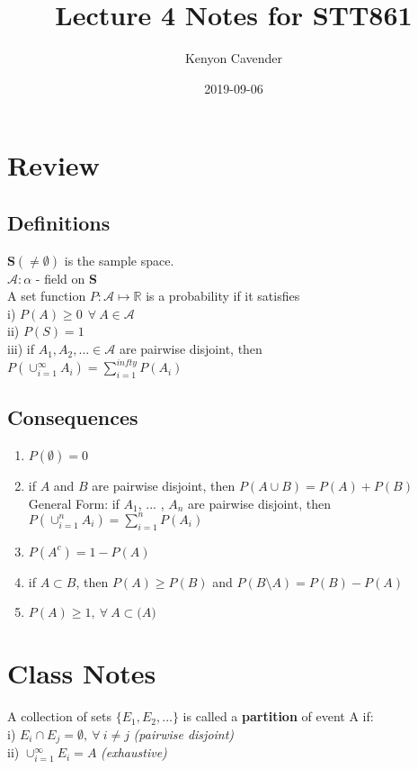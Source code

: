\documentclass[14pt, oneside, letterpaper]{notes}
\begin{document}
\title{Lecture 4 Notes for STT861}
\author{Kenyon Cavender}
\date{2019-09-06}
\maketitle

\section{Review}
\subsection*{Definitions}
$\textbf{S} ( \neq \emptyset )$ is the sample space. \\
$\mathscr{A} :  \alpha  $ - field on \textbf{S} \\
A set function $P: \mathscr{A} \mapsto \mathbb{R}$ is a probability if it satisfies \\
\indent i) $P(A) \geq 0 \: \: \forall \: A \in \mathscr{A}$ \\
\indent ii) $P(S) = 1 $\\
\indent iii) if $A_1 , A_2 , ... \in \mathscr{A}$ are pairwise disjoint, then \\
\indent \indent $ P(\cup_{i = 1}^{\infty} A_i ) = \sum_{i=1}^{infty} P( A_i )$

\subsection*{Consequences}
\begin{enumerate}
	\item $P(\emptyset) = 0$ 
	
	\item if $A$ and $B$ are pairwise disjoint, then $P(A \cup B) = P(A) + P(B)$ \\
	General Form: if $A_1$, ... , $A_n$ are pairwise disjoint, then \\
	$P(\cup_{i=1}^n A_i) = \sum_{i=1}^n P(A_i)$ 

	\item $P(A^c) = 1-P(A)$

	\item if $A \subset B$, then $P(A) \geq P(B)$ and $P(B \setminus A) = P(B) - P(A)$ 

	\item $P(A) \geq 1,  \: \forall \: A \subset \mathscr(A)$ 
\end{enumerate}

\section{Class Notes}
\begin{mydef}
	A collection of sets $\{E_1, E_2, ...\}$ is called a \textbf{partition} 
		of event A if: \\
	\indent i) $E_i \cap E_j = \emptyset, \: \forall \: i \neq j$ 
		\textit{(pairwise disjoint)} \\
  	\indent ii) $\cup_{i=1}^{\infty}E_i = A$ 
		\textit{(exhaustive)}
\end{mydef}
\end{document}
